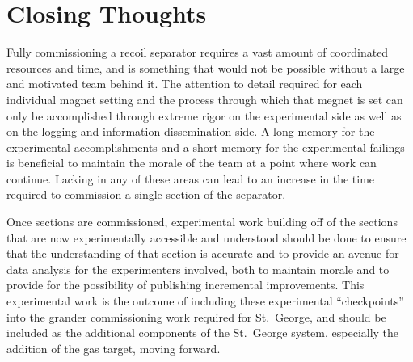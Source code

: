 \section{Closing Thoughts}
\label{sec:closing-thoughts}

Fully commissioning a recoil separator requires a vast amount of
coordinated resources and time, and is something that would not be
possible without a large and motivated team behind it. The attention to
detail required for each individual magnet setting and the process
through which that megnet is set can only be accomplished through
extreme rigor on the experimental side as well as on the logging and
information dissemination side. A long memory for the experimental
accomplishments and a short memory for the experimental failings is
beneficial to maintain the morale of the team at a point where work can
continue. Lacking in any of these areas can lead to an increase in the
time required to commission a single section of the separator.

Once sections are commissioned, experimental work building off of the
sections that are now experimentally accessible and understood should be
done to ensure that the understanding of that section is accurate and to
provide an avenue for data analysis for the experimenters involved, both
to maintain morale and to provide for the possibility of publishing
incremental improvements. This experimental work is the outcome of
including these experimental ``checkpoints'' into the grander
commissioning work required for St.\ George, and should be included as
the additional components of the St.\ George system, especially the
addition of the gas target, moving forward.

